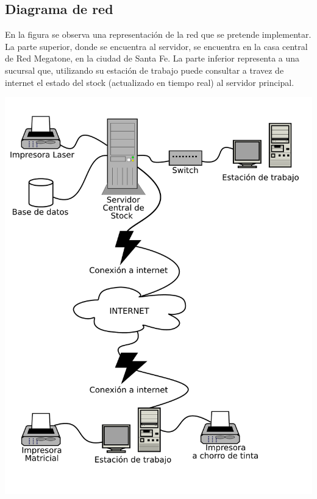 \subsection{Diagrama de red}

En la figura se observa una representación de la red que se pretende
implementar. La parte superior, donde se encuentra al servidor, se encuentra en
la casa central de Red Megatone, en la ciudad de Santa Fe. La parte inferior
representa a una sucursal que, utilizando su estación de trabajo puede
consultar a travez de internet el estado del stock (actualizado en tiempo real)
al servidor principal.

\includegraphics[width=\textwidth]{fase2/diagrama_red/diagrama_red.pdf}

